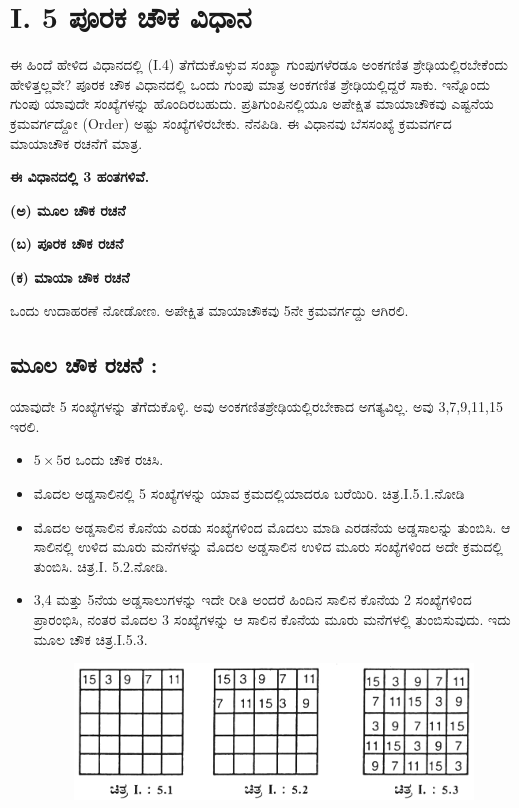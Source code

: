 \section{I. 5 ಪೂರಕ ಚೌಕ ವಿಧಾನ}

ಈ ಹಿಂದೆ ಹೇಳಿದ ವಿಧಾನದಲ್ಲಿ (I.4) ತೆಗೆದುಕೊಳ್ಳುವ ಸಂಖ್ಯಾ ಗುಂಪುಗಳೆರಡೂ ಅಂಕಗಣಿತ ಶ್ರೇಢಿಯಲ್ಲಿರಬೇಕೆಂದು ಹೇಳಿತ್ತಲ್ಲವೇ? ಪೂರಕ ಚೌಕ ವಿಧಾನದಲ್ಲಿ ಒಂದು ಗುಂಪು ಮಾತ್ರ ಅಂಕಗಣಿತ ಶ್ರೇಢಿಯಲ್ಲಿದ್ದರೆ ಸಾಕು. ಇನ್ನೊಂದು ಗುಂಪು ಯಾವುದೇ ಸಂಖ್ಯೆಗಳನ್ನು ಹೊಂದಿರಬಹುದು. ಪ್ರತಿಗುಂಪಿನಲ್ಲಿಯೂ ಅಪೇಕ್ಷಿತ ಮಾಯಾಚೌಕವು ಎಷ್ಟನೆಯ ಕ್ರಮವರ್ಗದ್ದೋ (Order) ಅಷ್ಟು ಸಂಖ್ಯೆಗಳಿರಬೇಕು. ನೆನಪಿಡಿ. ಈ ವಿಧಾನವು ಬೆಸಸಂಖ್ಯೆ ಕ್ರಮವರ್ಗದ ಮಾಯಾಚೌಕ ರಚನೆಗೆ ಮಾತ್ರ.

\textbf{ಈ ವಿಧಾನದಲ್ಲಿ 3 ಹಂತಗಳಿವೆ.}

\textbf{(ಅ) ಮೂಲ ಚೌಕ ರಚನೆ}

\textbf{(ಬ) ಪೂರಕ ಚೌಕ ರಚನೆ}

\textbf{(ಕ) ಮಾಯಾ ಚೌಕ ರಚನೆ}

ಒಂದು ಉದಾಹರಣೆ ನೋಡೋಣ. ಅಪೇಕ್ಷಿತ ಮಾಯಾಚೌಕವು 5ನೇ ಕ್ರಮವರ್ಗದ್ದು ಆಗಿರಲಿ.

\subsection{ಮೂಲ ಚೌಕ ರಚನೆ :}

ಯಾವುದೇ 5 ಸಂಖ್ಯೆಗಳನ್ನು ತೆಗೆದುಕೊಳ್ಳಿ. ಅವು ಅಂಕಗಣಿತಶ್ರೇಢಿಯಲ್ಲಿರಬೇಕಾದ ಅಗತ್ಯವಿಲ್ಲ. ಅವು 3,7,9,11,15 ಇರಲಿ.
\begin{itemize}
	\item $5 \times 5$ರ ಒಂದು ಚೌಕ ರಚಿಸಿ.
	\item ಮೊದಲ ಅಡ್ಡಸಾಲಿನಲ್ಲಿ 5 ಸಂಖ್ಯೆಗಳನ್ನು ಯಾವ ಕ್ರಮದಲ್ಲಿಯಾದರೂ ಬರೆಯಿರಿ. ಚಿತ್ರ.I.5.1.ನೋಡಿ
	\item ಮೊದಲ ಅಡ್ಡಸಾಲಿನ ಕೊನೆಯ ಎರಡು ಸಂಖ್ಯೆಗಳಿಂದ ಮೊದಲು ಮಾಡಿ ಎರಡನೆಯ ಅಡ್ಡಸಾಲನ್ನು ತುಂಬಿಸಿ. ಆ ಸಾಲಿನಲ್ಲಿ ಉಳಿದ ಮೂರು ಮನೆಗಳನ್ನು ಮೊದಲ ಅಡ್ಡಸಾಲಿನ ಉಳಿದ ಮೂರು ಸಂಖ್ಯೆಗಳಿಂದ ಅದೇ ಕ್ರಮದಲ್ಲಿ ತುಂಬಿಸಿ. ಚಿತ್ರ.I. 5.2.ನೋಡಿ.
	\item 3,4 ಮತ್ತು 5ನೆಯ ಅಡ್ಡಸಾಲುಗಳನ್ನು ಇದೇ ರೀತಿ ಅಂದರೆ ಹಿಂದಿನ ಸಾಲಿನ ಕೊನೆಯ 2 ಸಂಖ್ಯೆಗಳಿಂದ ಪ್ರಾರಂಭಿಸಿ, ನಂತರ ಮೊದಲ 3 ಸಂಖ್ಯೆಗಳನ್ನು ಆ ಸಾಲಿನ ಕೊನೆಯ ಮೂರು ಮನೆಗಳಲ್ಲಿ ತುಂಬಿಸುವುದು. ಇದು ಮೂಲ ಚೌಕ ಚಿತ್ರ.I.5.3.

	\begin{figure}[h]
	\includegraphics{src/figures/chap3/fig3.11.jpg}
	\end{figure}
\end{itemize}

